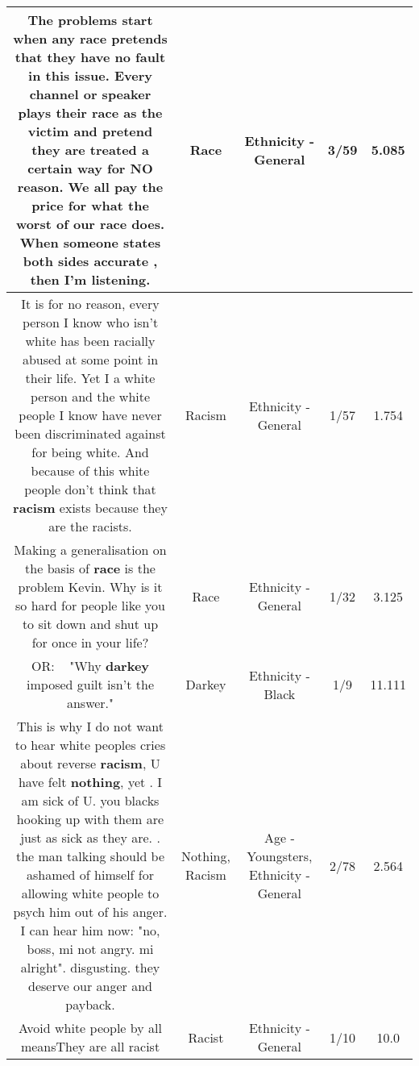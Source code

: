 \documentclass[11pt]{article}
\newlength\mylength
\begin{document}
\begin{center}
\begin{longtable}{|C{.65\mylength}|C{.30\mylength}|C{.12\mylength}|C{.12\mylength}|C{.12\mylength}|}
  \small The problems start when any \textbf{race} pretends that they have no fault in this issue.  Every channel or speaker plays their \textbf{race} as the victim and pretend they are treated a certain way for NO reason.  We all pay the price for what the worst of our \textbf{race} does.  When someone states both sides accurate , then I'm listening.\normalsize   & Race & Ethnicity - General & 3/59 & 5.085 \\  \hline
  \small It is for no reason, every person I know who isn't white has been racially abused at some point in their life. Yet I a white person and the white people I know have never been discriminated against for being white. And because of this white people don't think that \textbf{racism} exists because they are the racists.\normalsize   & Racism & Ethnicity - General & 1/57 & 1.754 \\  \hline
  \small Making a generalisation on the basis of \textbf{race} is the problem Kevin. Why is it so hard for people like you to sit down and shut up for once in your life?\normalsize   & Race & Ethnicity - General & 1/32 & 3.125 \\  \hline
  \small OR:  ~  "Why \textbf{darkey} imposed guilt isn't the answer."\normalsize   & Darkey & Ethnicity - Black & 1/9 & 11.111 \\  \hline
  \small This is why I do not want to hear white peoples cries about reverse \textbf{racism}, U have felt \textbf{nothing}, yet . I am sick of U.  you blacks hooking up with them are just as sick as they are. . the man talking should be ashamed of himself for allowing white people to psych him out of his anger. I can hear him now: "no, boss, mi not angry. mi alright". disgusting. they deserve our anger and payback.\normalsize   & Nothing, Racism & Age - Youngsters, Ethnicity - General & 2/78 & 2.564 \\  \hline
  \small Avoid white people by all meansThey are all racist\normalsize   & Racist & Ethnicity - General & 1/10 & 10.0 \\  \hline

\end{longtable}
\end{center}
\end{document}
